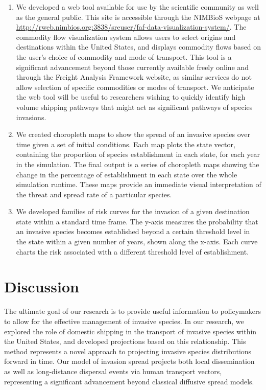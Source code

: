 \documentclass[12pt]{article}
\begin{document}
\begin{enumerate}

\item  We developed a web tool available for use by the scientific community as well as the general public. This site is accessible through the NIMBioS webpage at \url{http://rweb.nimbios.org:3838/sreuser/faf-data-visualization-system/}. The commodity flow visualization system allows users to select origins and destinations within the United States, and displays commodity flows based on the user's choice of commodity and mode of transport. This tool is a significant advancement beyond those currently available freely online and through the Freight Analysis Framework website, as similar services do not allow selection of specific commodities or modes of transport. We anticipate the web tool will be useful to researchers wishing to quickly identify high volume shipping pathways that might act as significant pathways of species invasions. 

\item We created choropleth maps to show the spread of an invasive species over time given a set of initial conditions. Each map plots the state vector, containing the proportion of species establishment in each state, for each year in the simulation. The final output is a series of choropleth maps showing the change in the percentage of establishment in each state over the whole simulation runtime. These maps provide an immediate visual interpretation of the threat and spread rate of a particular species. 

\item We developed families of risk curves for the invasion of a given destination state within a standard time frame. The y-axis measures the probability that an invasive species becomes established beyond a certain threshold level in the state within a given number of years, shown along the x-axis. Each curve charts the risk associated with a different threshold level of establishment.

\end{enumerate}


\section*{Discussion}

The ultimate goal of our research is to provide useful information to policymakers to allow for the effective management of invasive species. In our research, we explored the role of domestic shipping in the transport of invasive species within the United States, and developed projections based on this relationship. This method represents a novel approach to projecting invasive species distributions forward in time. Our model of invasion spread projects both local dissemination as well as long-distance dispersal events via human transport vectors, representing a significant advancement beyond classical diffusive spread models.
\end{document}

